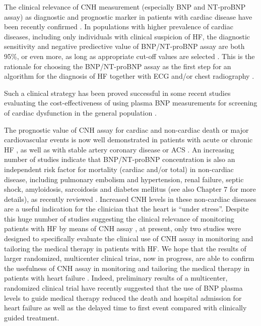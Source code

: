 \documentclass[14pt,a4paper,onecolumn]{extarticle}
\begin{document}
The clinical relevance of CNH measurement (especially BNP and NT-proBNP assay)
as diagnostic and prognostic marker in patients with cardiac disease have been recently confirmed \citep{bib35} \citep{bib372} \citep{bib376} \citep{bib3186} \citep{bib3296} \citep{bib3299} \citep{bib3300}. In populations with higher prevalence of cardiac diseases, including only individuals with clinical suspicion of HF, the diagnostic sensitivity and negative prediective value of BNP/NT-proBNP assay are both 95\%, or even
more, as long as appropriate cut-off values are selected \citep{bib35} \citep{bib372} \citep{bib3296}. This is the rationale for choosing the BNP/NT-proBNP assay as the first step for an algorithm for the
diagnosis of HF together with ECG and/or chest radiography \citep{bib369} \citep{bib370} \citep{bib3296} \citep{bib3299} \citep{bib3300}.

Such a clinical strategy has been proved successful in some recent studies evaluating the
cost-effectiveness of using plasma BNP measurements for screening of cardiac dysfunction in the general population \citep{bib392} \citep{bib393} \citep{bib394}.

The prognostic value of CNH assay for cardiac and non-cardiac death or major cardiovascular events is now well demonstrated in patients with acute or chronic HF \citep{bib35} \citep{bib372} \citep{bib376} \citep{bib3186} \citep{bib3296} \citep{bib3299} \citep{bib3300}, as well as with stable artery coronary disease or ACS \citep{bib35} \citep{bib376} \citep{bib3117} \citep{bib3138} \citep{bib3223} \citep{bib3224} \citep{bib3225} \citep{bib3226} \citep{bib3227} \citep{bib3228} \citep{bib3229} \citep{bib3230} \citep{bib3231} \citep{bib3232} \citep{bib3233} \citep{bib3234} \citep{bib3235} \citep{bib3236} \citep{bib3237} \citep{bib3238} \citep{bib3239} \citep{bib3240} \citep{bib3241} \citep{bib3242}. An increasing number of studies indicate that BNP/NT-proBNP concentration is also an independent risk factor for mortality (cardiac and/or total) in non-cardiac disease, including pulmonary embolism and hypertension, renal failure, septic
shock, amyloidosis, sarcoidosis and diabetes mellitus (see also Chapter 7 for more
details), as recently reviewed \citep{bib3298}. Increased CNH levels in these non-cardiac diseases
are a useful indication for the clinician that the heart is “under stress”.
Despite this huge number of studies suggesting the clinical relevance of monitoring patients with HF by means of CNH assay \citep{bib35}, at present, only two studies \citep{bib3252} \citep{bib3253}
were designed to specifically evaluate the clinical use of CNH assay in monitoring and
tailoring the medical therapy in patients with HF. We hope that the results of larger
randomized, multicenter clinical trias, now in progress, are able to confirm the usefulness of CNH assay in monitoring and tailoring the medical therapy in patients with
heart failure \citep{bib3296}. Indeed, preliminary results of a multicenter, randomized clinical
trial \citep{bib3297} have recently suggested that the use of BNP plasma levels to guide medical
therapy reduced the death and hospital admission for heart failure as well as the delayed
time to first event compared with clinically guided treatment.



\end{document}
